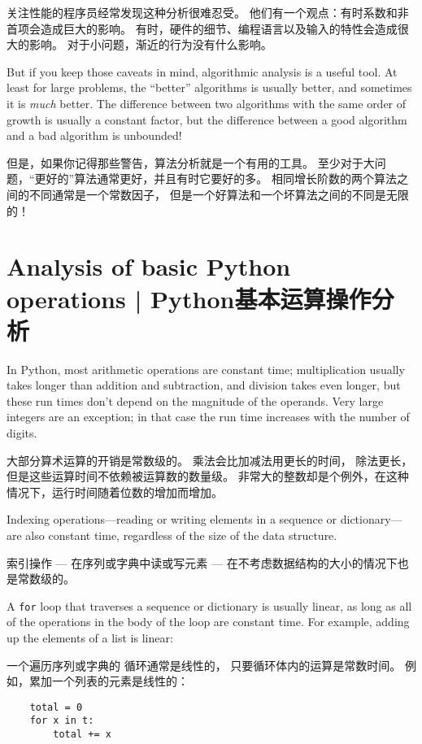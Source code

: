 关注性能的程序员经常发现这种分析很难忍受。
他们有一个观点：有时系数和非首项会造成巨大的影响。
有时，硬件的细节、编程语言以及输入的特性会造成很大的影响。
对于小问题，渐近的行为没有什么影响。

But if you keep those caveats in mind, algorithmic analysis is a
useful tool.  At least for large problems, the ``better'' algorithms
is usually better, and sometimes it is {\em much} better.  The
difference between two algorithms with the same order of growth is
usually a constant factor, but the difference between a good algorithm
and a bad algorithm is unbounded!

但是，如果你记得那些警告，算法分析就是一个有用的工具。
至少对于大问题，“更好的”算法通常更好，并且有时它要好的多。
相同增长阶数的两个算法之间的不同通常是一个常数因子，
但是一个好算法和一个坏算法之间的不同是无限的！


\section{Analysis of basic Python operations  |  Python基本运算操作分析}

In Python, most arithmetic operations are constant time;
multiplication usually takes longer than addition and subtraction, and
division takes even longer, but these run times don't depend on the
magnitude of the operands.  Very large integers are an exception; in
that case the run time increases with the number of digits.

大部分算术运算的开销是常数级的。 乘法会比加减法用更长的时间，
除法更长，但是这些运算时间不依赖被运算数的数量级。
非常大的整数却是个例外，在这种情况下，运行时间随着位数的增加而增加。

Indexing operations---reading or writing elements in a sequence
or dictionary---are also constant time, regardless of the size
of the data structure.

索引操作 --- 在序列或字典中读或写元素 --- 在不考虑数据结构的大小的情况下也是常数级的。

A {\tt for} loop that traverses a sequence or dictionary is
usually linear, as long as all of the operations in the body
of the loop are constant time.  For example, adding up the
elements of a list is linear:

一个遍历序列或字典的  循环通常是线性的， 只要循环体内的运算是常数时间。
例如，累加一个列表的元素是线性的：


\begin{lstlisting}
    total = 0
    for x in t:
        total += x
\end{lstlisting}

